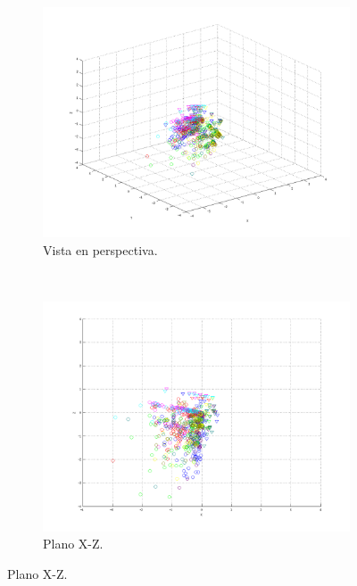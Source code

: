 \documentclass[informe.tex]{subfiles}
\begin{document}
      
	\begin{figure}[H]
        \centering
        \hspace*{-6.5cm}
        \begin{subfigure}[b]{0.49\textwidth}
                \includegraphics[width=\textwidth]{graficos/fold5_criterioParadao_reglaM_alpha0_rep2_0P.png}
                \caption{Vista en perspectiva.}
        \end{subfigure}%
        ~
        \begin{subfigure}[b]{0.49\textwidth}
                \includegraphics[width=\textwidth]{graficos/fold5_criterioParadao_reglaM_alpha0_rep2_1XZ.png}
                \caption{Plano X-Z.}
        \end{subfigure}
        

\end{figure}
\end{document}

